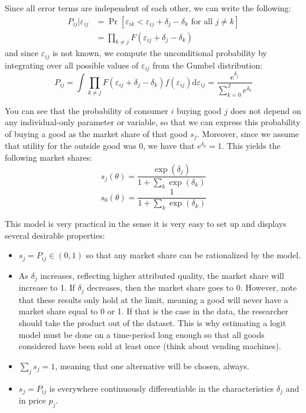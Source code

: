\documentclass[12pt]{report}
\def\D{\mathrm{d}}
\def\D{\mathrm{d}}
\newcommand{\prob}[1]{\operatorname{Pr}\left[#1\right]}
\begin{document}
Since all error terms are independent of each other, we can write the following:\begin{align*} P_{ij}\vert \varepsilon_{ij} & = \prob{ \varepsilon_{ik} < \varepsilon_{ij} + \delta_j - \delta_k \text{ for all } j\neq k } \\ & = \prod_{k\neq j} F(\varepsilon_{ij} + \delta_j - \delta_k)
\end{align*} and since $\varepsilon_{ij}$ is not known, we compute the unconditional probability by integrating over all possible values of $\varepsilon_{ij}$ from the Gumbel distribution: $$ P_{ij} = \int \prod_{k\neq j} F(\varepsilon_{ij} + \delta_j - \delta_k) f(\varepsilon_{ij})\D\varepsilon_{ij} = \frac{ e^{\delta_{j}} }{ \sum_{k=0}^{J} e^{\delta_{k}} } $$

You can see that the probability of consumer $i$ buying good $j$ does not depend on any individual-only parameter or variable, so that we can express this probability of buying a good as the market share of that good $s_j$. Moreover, since we assume that utility for the outside good was 0, we have that $e^{\delta_0} = 1$. This yields the following market shares: $$s_j(\theta) = \frac{\exp(\delta_j)}{1 + \sum_{k} \exp(\delta_{k})} $$ $$s_0(\theta) = \frac{1}{1 + \sum_{k} \exp(\delta_{k})} $$

This model is very practical in the sense it is very easy to set up and displays several desirable properties:\begin{itemize}
\item $s_j = P_{ij}\in(0,1)$ so that any market share can be rationalized by the model.
\item As $\delta_{j}$ increases, reflecting higher attributed quality, the market share will increase to 1. If $\delta_j$ decreases, then the market share goes to 0. However, note that these results only hold at the limit, meaning a good will never have a market share equal to 0 or 1. If that is the case in the data, the researcher should take the product out of the dataset. This is why estimating a logit model must be done on a time-period long enough so that all goods considered have been sold at least once (think about vending machines).
\item $\sum_j s_j = 1$, meaning that one alternative will be chosen, always.
\item $s_j = P_{ij}$ is everywhere continuously differentiable in the characteristics $\delta_{j}$ and in price $p_j$.
\end{itemize}
\end{document}
